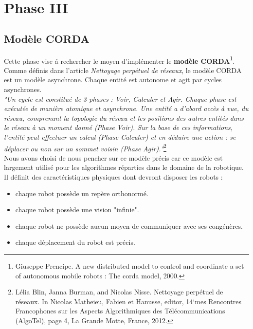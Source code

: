 \documentclass[a4paper,8pt]{report}
\begin{document}
\chapter{Phase III}

\section*{Modèle CORDA}\label{sec:name}

Cette phase vise \'a rechercher le moyen d'impl\'ementer le \textbf{mod\`ele CORDA}\footnote{Giuseppe Prencipe. A new distributed model to control and coordinate a set of autonomous mobile robots : The corda model, 2000.}.\\

\smallskip
Comme définis dans l'article \textit{Nettoyage perpétuel de réseaux}, le modèle CORDA est un modèle asynchrone. Chaque entité est autonome et agit par cycles asynchrones.\\


\textit{"Un cycle est constitu\'e de 3 phases : Voir, Calculer et Agir. Chaque phase est ex\'ecut\'ee de mani\`ere atomique et asynchrone. Une entit\'e a d’abord acc\`es \`a vue, du r\'eseau, comprenant la topologie du r\'eseau et les positions des autres entit\'es dans le r\'eseau \`a un moment donn\'e (Phase Voir). Sur la base de ces informations, l’entit\'e peut effectuer un calcul (Phase Calculer) et en d\'eduire une action : se d\'eplacer ou non sur un sommet voisin (Phase Agir)."}\footnote{L\'elia Blin, Janna Burman, and Nicolas Nisse. Nettoyage perpétuel de réseaux. In Nicolas Matheieu, Fabien et Hanusse, editor, 14`mes Rencontres Francophones sur les Aspects Algorithmiques des Télécommunications (AlgoTel), page 4, La Grande Motte, France, 2012.}\\


Nous avons choisi de nous pencher sur ce mod\`ele pr\'ecis car ce mod\`ele est largement utilis\'e pour les algorithmes r\'eparties dans le domaine de la robotique.\\

Il d\'efinit des caract\'eristiques physiques dont devront disposer les robots :

\begin{itemize}
\item chaque robot poss\`ede un rep\`ere orthonorm\'e.
\item chaque robot poss\`ede une vision "infinie".
\item chaque robot ne poss\`ede aucun moyen de communiquer avec ses cong\'en\`eres.
\item chaque d\'eplacement du robot est pr\'ecis.
\end{itemize}
\end{document}
